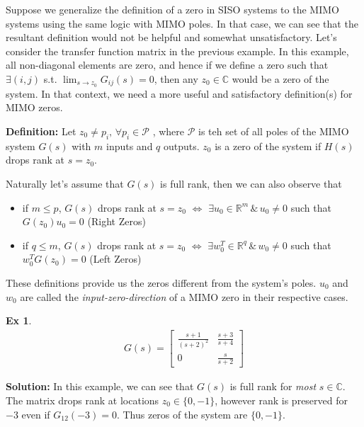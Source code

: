 \documentclass[twoside]{article}
\newtheorem{exmp}[theorem]{Ex}
\begin{document}
Suppose we generalize the definition of a zero in SISO systems to the MIMO systems using the same logic with MIMO poles. In that case, we can see that the resultant definition would not be helpful and somewhat unsatisfactory. Let's consider the transfer function matrix in the previous example. In this example, all non-diagonal elements are zero, and hence if we define a zero such that $\exists (i,j)$ s.t. $\lim_{s \to z_0}G_{ij}(s) = 0$, then any $z_0 \in \mathbb{C}$ would be a zero of the system. In that context, we need a more useful and satisfactory definition(s) for MIMO zeros.

\textbf{Definition:} Let $z_0 \neq p_i , \, \forall p_i \in \mathcal{P}$ , where $\mathcal{P}$ is teh set of all poles of the MIMO system $G(s)$ with $m$ inputs and
$q$ outputs. $z_0$ is a zero of the system if $H(s)$ drops rank at $s = z_0$.

Naturally let's assume that $G(s)$ is full rank, then we can also observe that
\begin{itemize}
\item if $m \leq p$, $G(s)$ drops rank at $s = z_0$ $\iff$ $\exists u_0 \in \mathbb{R}^{m} \, \& \, u_0 \neq 0$ such that $G(z_0) u_0 = 0$ (Right Zeros)
\item if $q \leq m$, $G(s)$ drops rank at $s = z_0$ $\iff$ $\exists w_0^T \in \mathbb{R}^{q} \, \& \, w_0 \neq 0$ such that $w_0^T G(z_0) = 0$ (Left Zeros)
\end{itemize}

These definitions provide us the zeros different from the system's poles. $u_0$ and $w_0$ are called the \textit{input-zero-direction} of a MIMO zero in their respective cases. 
%
\begin{exmp}
	\begin{align*}
	G(s) = \left[ \begin{array}{ccc} \frac{s+1}{(s+2)^2} & \frac{s+3}{s+4}  \\  
	0 & \frac{s}{s+2}  \end{array} \right]
	\end{align*}
\end{exmp}
%
\textbf{Solution:} In this example, we can see that $G(s)$ is full rank for \textit{most} $s \in \mathbb{C}$. The matrix drops rank at locations
$z_0 \in \lbrace 0 , -1 \rbrace$, however rank is preserved for $-3$ even if $G_{12}(-3) = 0$. Thus zeros of the system 
are $\lbrace 0 , -1 \rbrace$.
\end{document}

